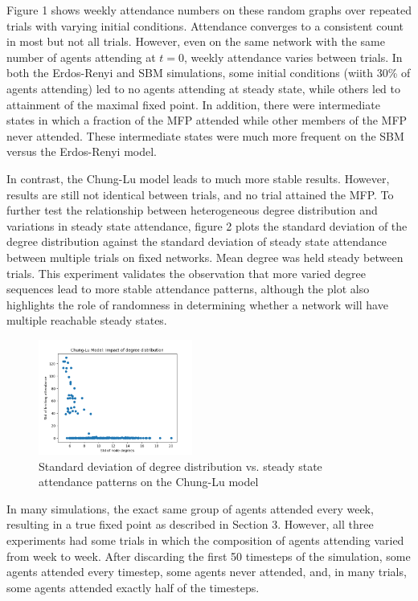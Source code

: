 \documentclass[12pt]{article}
\begin{document}
Figure 1 shows weekly attendance numbers on these random graphs over repeated trials with varying initial conditions.  Attendance converges to a consistent count in most but not all trials.  However, even on the same network with the same number of agents attending at $t=0$, weekly attendance varies between trials.  In both the Erdos-Renyi and SBM simulations, some initial conditions (wiith 30\% of agents attending) led to no agents attending at steady state, while others led to attainment of the maximal fixed point.  In addition, there were intermediate states in which a fraction of the MFP attended while other members of the MFP never attended.  These intermediate states were much more frequent on the SBM versus the Erdos-Renyi model. 

In contrast, the Chung-Lu model leads to much more stable results.  However, results are still not identical between trials, and no trial attained the MFP.  To further test the relationship between heterogeneous degree distribution and variations in steady state attendance, figure 2 plots the standard deviation of the degree distribution against the standard deviation of steady state attendance between multiple trials on fixed networks.  Mean degree was held steady between trials.  This experiment validates the observation that more varied degree sequences lead to more stable attendance patterns, although the plot also highlights the role of randomness in determining whether a network will have multiple reachable steady states.

\begin{figure}
  \includegraphics[width=0.45\textwidth]{chung_lu_std.png}
  \caption{Standard deviation of degree distribution vs. steady state attendance patterns on the Chung-Lu model}
\end{figure}

In many simulations, the exact same group of agents attended every week, resulting in a true fixed point as described in Section 3.  However, all three experiments had some trials in which the composition of agents attending varied from week to week.  After discarding the first 50 timesteps of the simulation, some agents attended every timestep, some agents never attended, and, in many trials, some agents attended exactly half of the timesteps.
\end{document}
